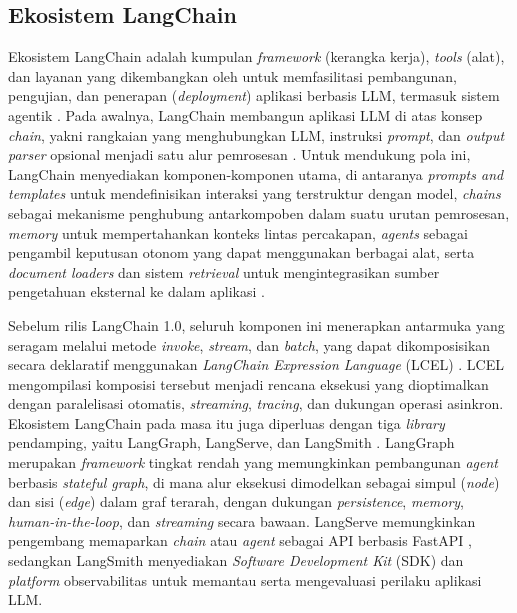 \subsection{Ekosistem LangChain}
Ekosistem LangChain adalah kumpulan \textit{framework} (kerangka kerja), \textit{tools} (alat), dan layanan yang dikembangkan oleh \textcite{langchainaiLangChain2025} untuk memfasilitasi pembangunan, pengujian, dan penerapan (\textit{deployment}) aplikasi berbasis LLM, termasuk sistem agentik \parencite{narayanMasteringLangChainComprehensive2025}. Pada awalnya, LangChain membangun aplikasi LLM di atas konsep \textit{chain}, yakni rangkaian yang menghubungkan LLM, instruksi \textit{prompt}, dan \textit{output parser} opsional menjadi satu alur pemrosesan \parencite{oshinLearningLangchainBuilding2025}. Untuk mendukung pola ini, LangChain menyediakan komponen-komponen utama, di antaranya \textit{prompts and templates} untuk mendefinisikan interaksi yang terstruktur dengan model, \textit{chains} sebagai mekanisme penghubung antarkompoben dalam suatu urutan pemrosesan, \textit{memory} untuk mempertahankan konteks lintas percakapan, \textit{agents} sebagai pengambil keputusan otonom yang dapat menggunakan berbagai alat, serta \textit{document loaders} dan sistem \textit{retrieval} untuk mengintegrasikan sumber pengetahuan eksternal ke dalam aplikasi \parencite{narayanMasteringLangChainComprehensive2025}.

Sebelum rilis LangChain 1.0, seluruh komponen ini menerapkan antarmuka yang seragam melalui metode \textit{invoke}, \textit{stream}, dan \textit{batch}, yang dapat dikomposisikan secara deklaratif menggunakan \textit{LangChain Expression Language} (LCEL) \parencite{oshinLearningLangchainBuilding2025}. LCEL mengompilasi komposisi tersebut menjadi rencana eksekusi yang dioptimalkan dengan paralelisasi otomatis, \textit{streaming}, \textit{tracing}, dan dukungan operasi asinkron. Ekosistem LangChain pada masa itu juga diperluas dengan tiga \textit{library} pendamping, yaitu LangGraph, LangServe, dan LangSmith \parencite{narayanMasteringLangChainComprehensive2025}. LangGraph \parencite{langchainaiLangGraph2025} merupakan \textit{framework} tingkat rendah yang memungkinkan pembangunan \textit{agent} berbasis \textit{stateful graph}, di mana alur eksekusi dimodelkan sebagai simpul (\textit{node}) dan sisi (\textit{edge}) dalam graf terarah, dengan dukungan \textit{persistence}, \textit{memory}, \textit{human-in-the-loop}, dan \textit{streaming} secara bawaan. LangServe \parencite{langserve} memungkinkan pengembang memaparkan \textit{chain} atau \textit{agent} sebagai API berbasis FastAPI \parencite{fastapi}, sedangkan LangSmith \parencite{langchainaiLangSmithSDK2025} menyediakan \textit{Software Development Kit} (SDK) dan \textit{platform} observabilitas untuk memantau serta mengevaluasi perilaku aplikasi LLM.

